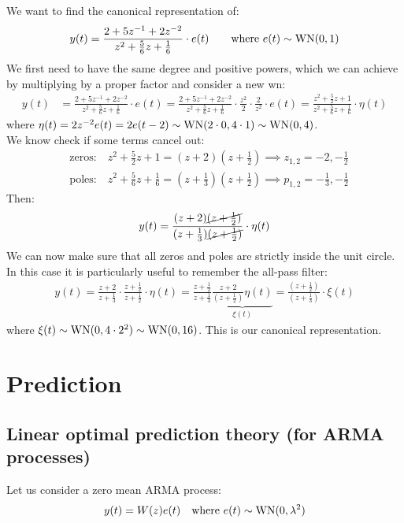 \begin{example}
We want to find the canonical representation of:
\begin{align*}
	y(t)=\frac{2+5z^{-1}+2z^{-2}}{z^2+\frac{5}{6}z+\frac{1}{6}}\cdot e(t)  \qquad \text{where } e(t)\sim \operatorname{WN}(0,1)
\end{align*}
We first need to have the same degree and positive powers, which we can achieve by multiplying by a proper factor and consider a new \gls{wn}:
\begin{align*}
	y(t)&=\frac{2+5z^{-1}+2z^{-2}}{z^2+\frac{5}{6}z+\frac{1}{6}}\cdot e(t)=\frac{2+5z^{-1}+2z^{-2}}{z^2+\frac{5}{6}z+\frac{1}{6}}\cdot\frac{z^2}{2}\cdot\frac{2}{z^2}\cdot e(t)=\frac{z^2+\frac{5}{2}z+1}{z^2+\frac{5}{6}z+\frac{1}{6}}\cdot \eta(t)
\end{align*}
where $\eta(t)=2z^{-2}e(t)=2e(t-2)\sim \operatorname{WN}(2\cdot0,4\cdot 1)\sim \operatorname{WN}(0,4)$.\\
We know check if some terms cancel out:
\begin{align*}
	&\text{zeros:}\quad z^2+\frac{5}{2}z+1=(z+2)\left( z+\frac{1}{2} \right)   \implies z_{1,2}=-2,-\frac{1}{2}\\
	&\text{poles:}\quad z^2+\frac{5}{6}z+\frac{1}{6}=\left( z+\frac{1}{3} \right)  \left( z+\frac{1}{2} \right) \implies p_{1,2}=-\frac{1}{3},-\frac{1}{2}
\end{align*}
Then:
\begin{align*}
	y(t)=\frac{(z+2)\cancel{(z+\frac{1}{2})}}{(z+\frac{1}{3})\cancel{(z+\frac{1}{2})}}\cdot \eta(t) 
\end{align*}
We can now make sure that all zeros and poles are strictly inside the unit circle. In this case it is particularly useful to remember the all-pass filter:
\begin{align*}
	y(t)=\frac{z+2}{z+\frac{1}{3}}\cdot\frac{z+\frac{1}{2} }{z+\frac{1}{2}}\cdot\eta(t)=\frac{z+\frac{1}{2}}{z+\frac{1}{3}}\underbrace{\frac{z+2}{(z+\frac{1}{2})}\eta(t)}_{\xi(t)}=\frac{(z+\frac{1}{2})}{(z+\frac{1}{3})}\cdot \xi(t)
\end{align*}
where $\xi(t)\sim \operatorname{WN}(0,4\cdot2^2)\sim \operatorname{WN}(0,16)$. This is our canonical representation.
\end{example}
\chapter{Prediction}
\section{Linear optimal prediction theory (for ARMA processes)}
Let us consider a zero mean ARMA process:
\[
	y(t)=W(z)e(t) \quad \text{where }e(t)\sim \operatorname{WN}(0,\lambda^{2} )
\]

